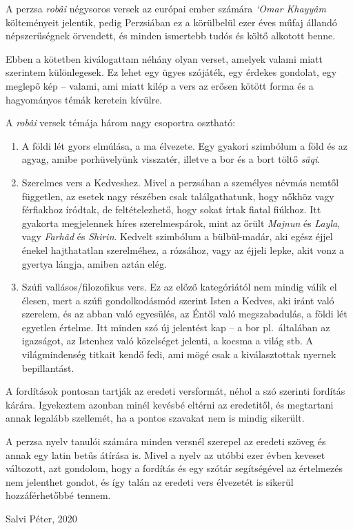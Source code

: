A perzsa \emph{robâi} négysoros versek az európai ember számára \emph{`Omar
Khayyâm} költeményeit jelentik, pedig Perzsiában ez a körülbelül ezer
éves műfaj állandó népszerűségnek örvendett, és minden ismertebb tudós
és költő alkotott benne.

Ebben a kötetben kiválogattam néhány olyan verset, a\-me\-lyek valami
miatt szerintem különlegesek. Ez lehet egy ügyes szójáték, egy érdekes
gondolat, egy meglepő kép -- valami, ami miatt kilép a vers az erősen
kötött forma és a hagyományos témák keretein kívülre.

A \emph{robâi} versek témája három nagy csoportra osztható:

\begin{enumerate}
\item A földi lét gyors elmúlása, a ma élvezete. Egy gyakori
  szimbólum a föld és az agyag, amibe porhüvelyünk visszatér, illetve
  a bor és a bort töltő \emph{sâqi}.
\item Szerelmes vers a Kedveshez. Mivel a perzsában a személyes névmás
  nemtől független, az esetek nagy részében csak találgathatunk, hogy
  nőkhöz vagy férfiakhoz íródtak, de feltételezhető, hogy sokat írtak
  fiatal fiúkhoz. Itt gyakorta megjelennek híres szerelmespárok, mint
  az őrült \emph{Majnun} és \emph{Layla}, vagy \emph{Farhâd} és
  \emph{Shirin}. Kedvelt szimbólum a bülbül-madár, aki egész éjjel
  énekel hajthatatlan szerelméhez, a rózsához, vagy az éjjeli lepke,
  akit vonz a gyertya lángja, amiben aztán elég.
\item Szúfi vallásos/filozofikus vers. Ez az előző kategóriától nem mindig válik
  el élesen, mert a szúfi gondolkodásmód szerint Isten a Kedves, aki
  iránt való szerelem, és az abban való egyesülés, az Éntől való
  megszabadulás, a földi lét egyetlen értelme. Itt minden szó új
  jelentést kap -- a bor pl.~általában az igazságot, az Istenhez való
  közelséget jelenti, a kocsma a világ stb. A világmindenség titkait
  kendő fedi, ami mögé csak a kiválasztottak nyernek bepillantást.
\end{enumerate}

A fordítások pontosan tartják az eredeti versformát, néhol a szó
szerinti fordítás kárára. Igyekeztem azonban minél kevésbé eltérni az
eredetitől, és megtartani annak legalább szellemét, ha a pontos
szavakat nem is mindig sikerült.

A perzsa nyelv tanulói számára minden versnél szerepel az eredeti
szöveg és annak egy latin betűs átírása is. Mivel a nyelv az utóbbi
ezer évben keveset változott, azt gondolom, hogy a fordítás és egy
szótár segítségével az értelmezés nem jelenthet gondot, és így talán
az eredeti vers élvezetét is sikerül hozzáférhetőbbé tennem.

\begin{flushright}
  Salvi Péter, 2020
\end{flushright}
